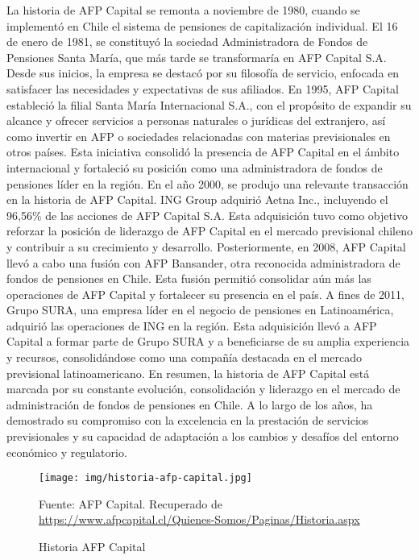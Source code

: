 La historia de AFP Capital se remonta a noviembre de 1980, cuando se implementó en Chile el sistema de pensiones de capitalización individual. El 16 de enero de 1981, se constituyó la sociedad Administradora de Fondos de Pensiones Santa María, que más tarde se transformaría en AFP Capital S.A. Desde sus inicios, la empresa se destacó por su filosofía de servicio, enfocada en satisfacer las necesidades y expectativas de sus afiliados. 
En 1995, AFP Capital estableció la filial Santa María Internacional S.A., con el propósito de expandir su alcance y ofrecer servicios a personas naturales o jurídicas del extranjero, así como invertir en AFP o sociedades relacionadas con materias previsionales en otros países. Esta iniciativa consolidó la presencia de AFP Capital en el ámbito internacional y fortaleció su posición como una administradora de fondos de pensiones líder en la región. 
En el año 2000, se produjo una relevante transacción en la historia de AFP Capital. ING Group adquirió Aetna Inc., incluyendo el 96,56\% de las acciones de AFP Capital S.A. Esta adquisición tuvo como objetivo reforzar la posición de liderazgo de AFP Capital en el mercado previsional chileno y contribuir a su crecimiento y desarrollo. 
Posteriormente, en 2008, AFP Capital llevó a cabo una fusión con AFP Bansander, otra reconocida administradora de fondos de pensiones en Chile. Esta fusión permitió consolidar aún más las operaciones de AFP Capital y fortalecer su presencia en el país. A fines de 2011, Grupo SURA, una empresa líder en el negocio de pensiones en Latinoamérica, adquirió las operaciones de ING en la región. Esta adquisición llevó a AFP Capital a formar parte de Grupo SURA y a beneficiarse de su amplia experiencia y recursos, consolidándose como una compañía destacada en el mercado previsional latinoamericano. En resumen, la historia de AFP Capital está marcada por su constante evolución, consolidación y liderazgo en el mercado de administración de fondos de pensiones en Chile. A lo largo de los años, ha demostrado su compromiso con la excelencia en la prestación de servicios previsionales y su capacidad de adaptación a los cambios y desafíos del entorno económico y regulatorio.

\begin{figure}[H]
    \begin{minipage}[t]{0.9\textwidth}
        \caption{Historia AFP Capital}
        \label{historia-afp}        
    \end{minipage}

    \vspace{10pt}

    \begin{minipage}[b]{1.1\textwidth}
        \centering
        \texttt{[image: img/historia-afp-capital.jpg]}        
    \end{minipage}

    \begin{minipage}[t]{0.9\textwidth}
        Fuente: AFP Capital. Recuperado de \url{https://www.afpcapital.cl/Quienes-Somos/Paginas/Historia.aspx}
    \end{minipage}
\end{figure}